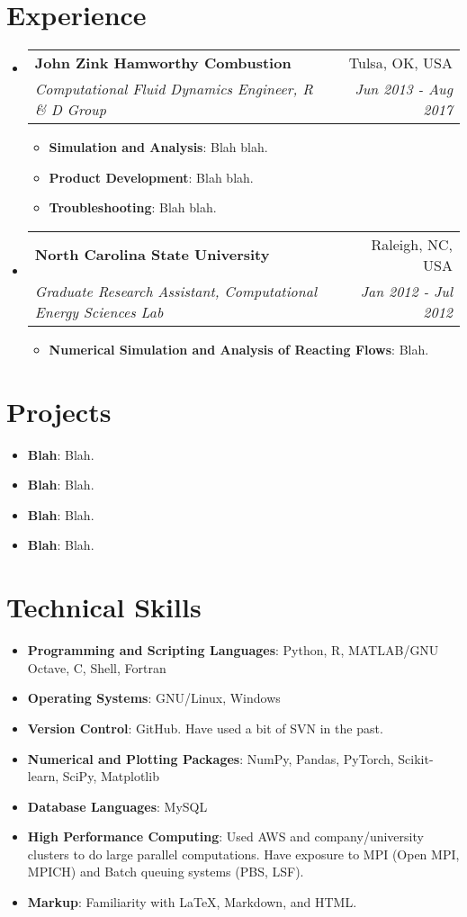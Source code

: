 \documentclass[letterpaper,11pt]{article}
\makeatletter
\newcommand{\resumeItem}[2]{
	\item\small{
		\textbf{#1}{: #2 \vspace{-2pt}}
	}
}
\newcommand{\resumeSubheading}[4]{
	\vspace{-1pt}\item
	\begin{tabular*}{0.97\textwidth}[t]{l@{\extracolsep{\fill}}r}
		\textbf{#1} & #2 \\
		\textit{\small#3} & \textit{\small #4} \\
	\end{tabular*}\vspace{-5pt}
}
\newcommand{\resumeSubItem}[2]{\resumeItem{#1}{#2}\vspace{-4pt}}
\newcommand{\resumeSubHeadingListStart}{\begin{itemize}[leftmargin=*]}
\newcommand{\resumeSubHeadingListEnd}{\end{itemize}}
\newcommand{\resumeItemListStart}{\begin{itemize}}
\newcommand{\resumeItemListEnd}{\end{itemize}\vspace{-5pt}}
\makeatother
\begin{document}
	\section{Experience}
	\resumeSubHeadingListStart
	
	\resumeSubheading
	{John Zink Hamworthy Combustion}{Tulsa, OK, USA}
	{Computational Fluid Dynamics Engineer, R \& D Group}{Jun 2013 - Aug 2017}
	\resumeItemListStart
	\resumeItem{Simulation and Analysis}
	{Blah blah.}
	\resumeItem{Product Development}
	{Blah blah.}
	\resumeItem{Troubleshooting}
	{Blah blah.}
	\resumeItemListEnd
	
	\resumeSubheading
	{North Carolina State University}{Raleigh, NC, USA}
	{Graduate Research Assistant, Computational Energy Sciences Lab}{Jan 2012 - Jul 2012}
	\resumeItemListStart
	\resumeItem{Numerical Simulation and Analysis of Reacting Flows}
	{Blah.}
	\resumeItemListEnd	
	\resumeSubHeadingListEnd
	
	\section{Projects}
	\resumeSubHeadingListStart
	\resumeSubItem{Blah}
	{Blah.}
	\resumeSubItem{Blah}
	{Blah.}
	\resumeSubItem{Blah}
	{Blah.}
	\resumeSubItem{Blah}
	{Blah.}
	\resumeSubHeadingListEnd
	
	\section{Technical Skills}
	\resumeSubHeadingListStart
	\resumeSubItem{Programming and Scripting Languages}
	{Python, R, MATLAB/GNU Octave, C, Shell, Fortran}
	\resumeSubItem{Operating Systems}
	{GNU/Linux, Windows}
	\resumeSubItem{Version Control}
	{GitHub. Have used a bit of SVN in the past.}
	\resumeSubItem{Numerical and Plotting Packages}
	{NumPy, Pandas, PyTorch, Scikit-learn, SciPy, Matplotlib}
	\resumeSubItem{Database Languages}
	{MySQL}
	\resumeSubItem{High Performance Computing}
	{Used AWS and company/university clusters to do large parallel computations. Have exposure to MPI (Open MPI, MPICH) and Batch queuing systems (PBS, LSF).}
	\resumeSubItem{Markup}
	{Familiarity with \LaTeX, Markdown, and HTML.}
	\resumeSubHeadingListEnd
	
\end{document}
